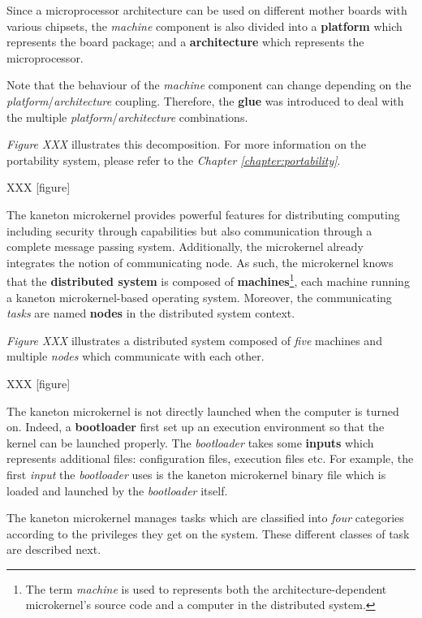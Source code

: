 Since a microprocessor architecture can be used on different mother boards
with various chipsets, the \textit{machine} component is also divided into
a \textbf{platform} which represents the board package; and a
\textbf{architecture} which represents the microprocessor.

Note that the behaviour of the \textit{machine} component can change depending
on the \textit{platform}/\textit{architecture} coupling. Therefore, the
\textbf{glue} was introduced to deal with the multiple
\textit{platform}/\textit{architecture} combinations.

\textit{Figure XXX} illustrates this decomposition. For more information on
the portability system, please refer to the \textit{Chapter
\ref{chapter:portability}}.

XXX [figure]

The kaneton microkernel provides powerful features for distributing computing
including security through capabilities but also communication through a
complete message passing system. Additionally, the microkernel already
integrates the notion of communicating node. As such, the microkernel knows
that the \textbf{distributed system} is composed of
  \textbf{machines}\footnote{The term \textit{machine} is used to represents
                             both the architecture-dependent microkernel's
                             source code and a computer in the distributed
                             system.},
each machine running a kaneton microkernel-based operating system. Moreover,
the communicating \textit{tasks} are named \textbf{nodes} in the distributed
system context.

\textit{Figure XXX} illustrates a distributed system composed of \textit{five}
machines and multiple \textit{nodes} which communicate with each other.

XXX [figure]

The kaneton microkernel is not directly launched when the computer is
turned on. Indeed, a \textbf{bootloader} first set up an execution environment
so that the kernel can be launched properly. The \textit{bootloader} takes
some \textbf{inputs} which represents additional files: configuration
files, execution files etc. For example, the first \textit{input} the
\textit{bootloader} uses is the kaneton microkernel binary file which is
loaded and launched by the \textit{bootloader} itself.

The kaneton microkernel manages tasks which are classified into \textit{four}
categories according to the privileges they get on the system. These different
classes of task are described next.

